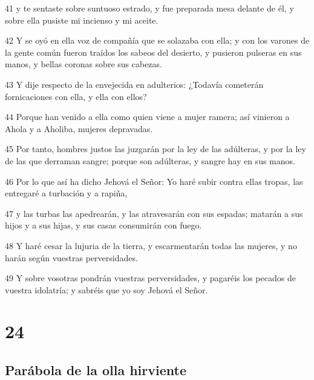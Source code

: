 \par 41 y te sentaste sobre suntuoso estrado, y fue preparada mesa delante de él, y sobre ella pusiste mi incienso y mi aceite.
\par 42 Y se oyó en ella voz de compañía que se solazaba con ella; y con los varones de la gente común fueron traídos los sabeos del desierto, y pusieron pulseras en sus manos, y bellas coronas sobre sus cabezas.
\par 43 Y dije respecto de la envejecida en adulterios: ¿Todavía cometerán fornicaciones con ella, y ella con ellos?
\par 44 Porque han venido a ella como quien viene a mujer ramera; así vinieron a Ahola y a Aholiba, mujeres depravadas.
\par 45 Por tanto, hombres justos las juzgarán por la ley de las adúlteras, y por la ley de las que derraman sangre; porque son adúlteras, y sangre hay en sus manos.
\par 46 Por lo que así ha dicho Jehová el Señor: Yo haré subir contra ellas tropas, las entregaré a turbación y a rapiña,
\par 47 y las turbas las apedrearán, y las atravesarán con sus espadas; matarán a sus hijos y a sus hijas, y sus casas consumirán con fuego.
\par 48 Y haré cesar la lujuria de la tierra, y escarmentarán todas las mujeres, y no harán según vuestras perversidades.
\par 49 Y sobre vosotras pondrán vuestras perversidades, y pagaréis los pecados de vuestra idolatría; y sabréis que yo soy Jehová el Señor.

\chapter{24}

\section*{Parábola de la olla hirviente}

